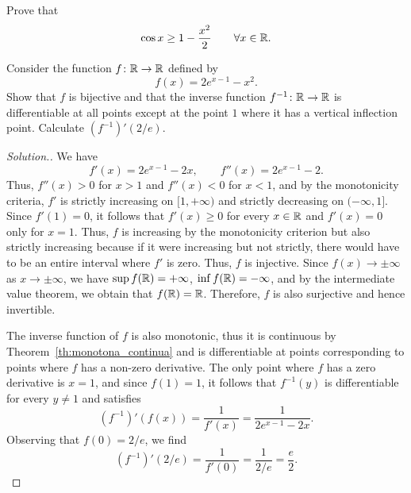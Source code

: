 \begin{exercise}
Prove that
\[
  \cos x \ge 1- \frac{x^2}{2} \qquad \forall x \in {\mathbb R}.
\]
\end{exercise}

\begin{exercise}
Consider the function $f\colon {\mathbb R} \to {\mathbb R}$ defined by
\[
  f(x) = 2e^{x-1} - x^2.
\]
Show that $f$ is bijective and that the inverse function $f^{-1}\colon {\mathbb R} \to
{\mathbb R}$ is differentiable at all points except at the point $1$ where it has a
vertical inflection point. Calculate $(f^{-1})'(2/e)$.
\end{exercise}
\begin{proof}[Solution.]
We have
\[
  f'(x) = 2e^{x-1} - 2x, \qquad f''(x) = 2e^{x-1}-2.
\]
Thus, $f''(x) > 0$ for $x > 1$ and $f''(x)< 0$ for $x<1$, and by the
monotonicity criteria, $f'$ is strictly increasing on $[1,+\infty)$ and strictly
decreasing on $(-\infty, 1]$. Since $f'(1)=0$, it follows that $f'(x)\ge 0$ for
every $x\in {\mathbb R}$ and $f'(x)=0$ only for $x=1$. Thus, $f$ is increasing by the
monotonicity criterion but also strictly increasing because if it were
increasing but not strictly, there would have to be an entire interval where
$f'$ is zero. Thus, $f$ is injective. Since $f(x)\to \pm\infty$ as $x\to
\pm\infty$, we have $\sup f({\mathbb R}) = +\infty$, $\inf f({\mathbb R}) = -\infty$, and by the
intermediate value theorem, we obtain that $f({\mathbb R})={\mathbb R}$. Therefore, $f$ is also
surjective and hence invertible.

The inverse function of $f$ is also monotonic, thus it is continuous by
Theorem~\ref{th:monotona_continua} and is differentiable at points corresponding
to points where $f$ has a non-zero derivative. The only point where $f$ has a
zero derivative is $x=1$, and since $f(1) = 1$, it follows that $f^{-1}(y)$ is
differentiable for every $y\neq 1$ and satisfies
\[
  (f^{-1})'(f(x)) = \frac{1}{f'(x)} = \frac{1}{2 e^{x-1}-2x}.
\]
Observing that $f(0)=2/e$, we find
\[
  (f^{-1})'(2/e) = \frac{1}{f'(0)} = \frac{1}{2/e} = \frac e 2.
\]
\end{proof}